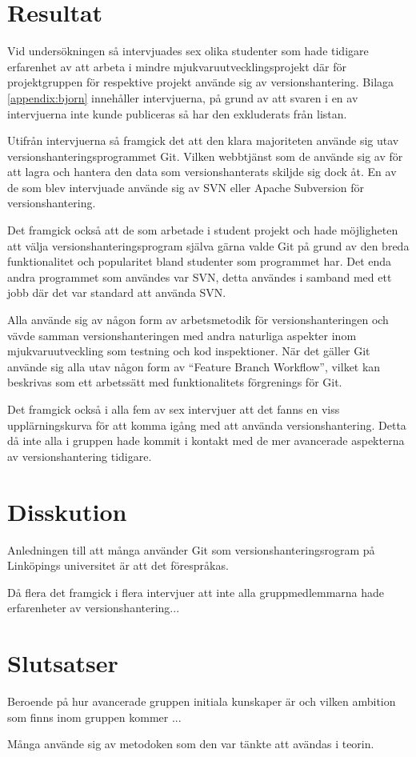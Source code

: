 \section{Resultat}
Vid undersökningen så intervjuades sex olika studenter som hade tidigare erfarenhet av att arbeta i mindre mjukvaruutvecklingsprojekt där för projektgruppen för respektive projekt använde sig av versionshantering. Bilaga \ref{appendix:bjorn} innehåller intervjuerna, på grund av att svaren i en av intervjuerna inte kunde publiceras så har den exkluderats från listan.

Utifrån intervjuerna så framgick det att den klara majoriteten använde sig utav versionshanteringsprogrammet Git. Vilken webbtjänst som de använde sig av för att lagra och hantera den data som versionshanterats skiljde sig dock åt. En av de som blev intervjuade använde sig av SVN eller Apache Subversion för versionshantering.\cite{VersionControlSvn}

Det framgick också att de som arbetade i student projekt och hade möjligheten att välja versionshanteringsprogram själva gärna valde Git på grund av den breda funktionalitet och popularitet bland studenter som programmet har. Det enda andra programmet som användes var SVN, detta användes i samband med ett jobb där det var standard att använda SVN.

Alla använde sig av någon form av arbetsmetodik för versionshanteringen och vävde samman versionshanteringen med andra naturliga aspekter inom mjukvaruutveckling som testning och kod inspektioner. När det gäller Git använde sig alla utav någon form av ``Feature Branch Workflow'', vilket kan beskrivas som ett arbetssätt med funktionalitets förgrenings för Git.



Det framgick också i alla fem av sex intervjuer att det fanns en viss upplärningskurva för att komma igång med att använda versionshantering. Detta då inte alla i gruppen hade kommit i kontakt med de mer avancerade aspekterna av versionshantering tidigare.

\section{Disskution}

Anledningen till att många använder Git som versionshanteringsrogram på Linköpings universitet är att det förespråkas.

Då flera det framgick i flera intervjuer att inte alla gruppmedlemmarna hade erfarenheter av versionshantering...

\section{Slutsatser}

Beroende på hur avancerade gruppen initiala kunskaper är och vilken ambition som finns inom gruppen kommer ...

Många använde sig av metodoken som den var tänkte att avändas i teorin.
